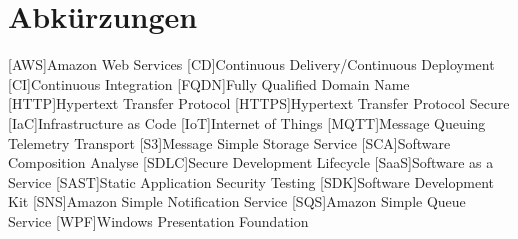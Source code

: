 \chapter*{Abkürzungen}

\begin{acronym}
    [AWS]{Amazon Web Services}
    [CD]{Continuous Delivery/Continuous Deployment}
    [CI]{Continuous Integration}
    [FQDN]{Fully Qualified Domain Name}
    [HTTP]{Hypertext Transfer Protocol}
    [HTTPS]{Hypertext Transfer Protocol Secure}    
    [IaC]{Infrastructure as Code}
    [IoT]{Internet of Things}
    [MQTT]{Message Queuing Telemetry Transport}
    [S3]{Message Simple Storage Service}
    [SCA]{Software Composition Analyse}
    [SDLC]{Secure Development Lifecycle}
    [SaaS]{Software as a Service}
    [SAST]{Static Application Security Testing}  
    [SDK]{Software Development Kit}
    [SNS]{Amazon Simple Notification Service}
    [SQS]{Amazon Simple Queue Service}
    [WPF]{Windows Presentation Foundation}    
\end{acronym}

